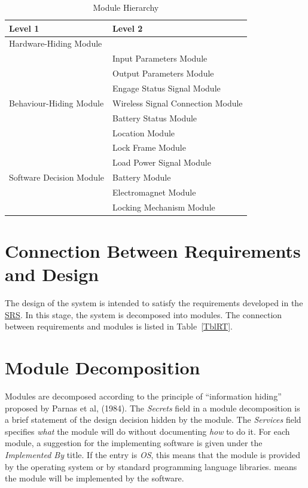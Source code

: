 \documentclass[12pt, titlepage]{article}
\begin{document}
\begin{table}[h!]
\centering
\begin{tabular}{p{} p{}}
\toprule
\textbf{Level 1} & \textbf{Level 2}\\
\midrule

{Hardware-Hiding Module} & ~ \\
\midrule

\multirow{7}{0.3\textwidth}{Behaviour-Hiding Module} & Input Parameters Module \\
& Output Parameters Module \\
& Engage Status Signal Module \\
& Wireless Signal Connection Module \\
& Battery Status Module \\
& Location Module \\ 
& Lock Frame Module \\
\midrule

\multirow{3}{0.3\textwidth}{Software Decision Module} & Load Power Signal Module \\
& Battery Module \\
& Electromagnet Module \\
& Locking Mechanism Module \\
\bottomrule

\end{tabular}
\caption{Module Hierarchy}
\label{TblMH}
\end{table}

\section{Connection Between Requirements and Design} \label{SecConnection}

The design of the system is intended to satisfy the requirements developed in
the \href{https://github.com/NevoAbigail/Capstone/blob/main/docs/SRS/SRS.pdf}{SRS}. In this stage, the system is decomposed into modules. The connection
between requirements and modules is listed in Table~\ref{TblRT}.

\section{Module Decomposition} \label{SecMD}

Modules are decomposed according to the principle of ``information hiding''
proposed by Parnas et al, (1984). The \emph{Secrets} field in a module
decomposition is a brief statement of the design decision hidden by the
module. The \emph{Services} field specifies \emph{what} the module will do
without documenting \emph{how} to do it. For each module, a suggestion for the
implementing software is given under the \emph{Implemented By} title. If the
entry is \emph{OS}, this means that the module is provided by the operating
system or by standard programming language libraries.  \emph{\progname{}} means the
module will be implemented by the \progname{} software.
\end{document}
